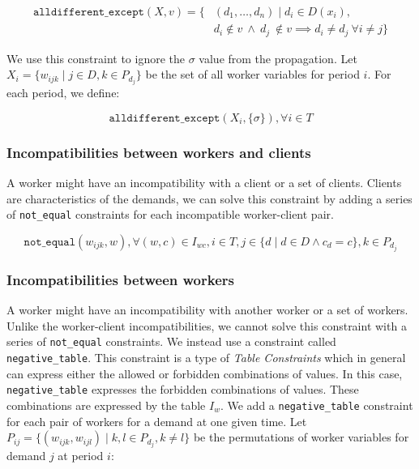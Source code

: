 \documentclass[../../thesis.tex]{subfiles}
\begin{document}
\begin{align*}
   \texttt{alldifferent\_except} (X, v) = \{& (d_1, \dots, d_n) \mid d_i \in D(x_i), \\ 
   & d_i \notin v \ \land \ d_j \ \notin v \implies d_i \neq d_j \ \forall i \neq j \}
\end{align*}

We use this constraint to ignore the $\sigma$ value from the propagation. Let $X_i = \{w_{ijk} \mid j \in D, k \in P_{d_j} \}$ be the set of all worker variables for period $i$. For each period, we define:

\begin{equation}
  \texttt{alldifferent\_except}(X_i, \{ \sigma \}), \forall i \in T
\end{equation}

\subsubsection{Incompatibilities between workers and clients}

A worker might have an incompatibility with a client or a set of clients. 
Clients are characteristics of the demands, we can solve this constraint by adding 
a series of \texttt{not\_equal} constraints for each incompatible worker-client pair.

\begin{equation}
  \texttt{not\_equal}(w_{ijk}, w), \forall (w, c) \in I_{wc}, i \in T, j \in \{ d \mid d \in D \land c_d = c \}, k \in P_{d_j}
\end{equation}

\subsubsection{Incompatibilities between workers}

A worker might have an incompatibility with another worker or a set of workers. 
Unlike the worker-client incompatibilities, we cannot solve this constraint with a series of \texttt{not\_equal} constraints. We instead use a constraint 
called \texttt{negative\_table}. This constraint is a type of \emph{Table Constraints} \cite{Henteryck:Table} which in general can
express either the allowed or forbidden combinations of values. In this case, \texttt{negative\_table} expresses the forbidden combinations of values.
These combinations are expressed by the table $I_{w}$. 
We add a \texttt{negative\_table} constraint for each pair of workers for a demand at one given time. Let $P_{ij} = \{ (w_{ijk}, w_{ijl}) \mid k, l \in P_{d_j}, k \neq l \}$ 
be the permutations of worker variables for demand $j$ at period $i$:
\end{document}
